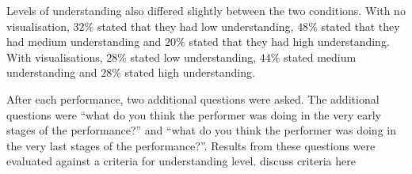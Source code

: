 Levels of understanding also differed slightly between the two conditions. With no visualisation, $32\%$ stated that they had low understanding, $48\%$ stated that they had medium understanding and $20\%$ stated that they had high understanding. With visualisations, $28\%$ stated low understanding, $44\%$ stated medium understanding and $28\%$ stated high understanding.


After each performance, two additional questions were asked. The additional questions were ``what do you think the performer was doing in the very early stages of the performance?'' and ``what do you think the performer was doing in the very last stages of the performance?''. Results from these questions were evaluated against a criteria for understanding level. {\color{red} discuss criteria here}


